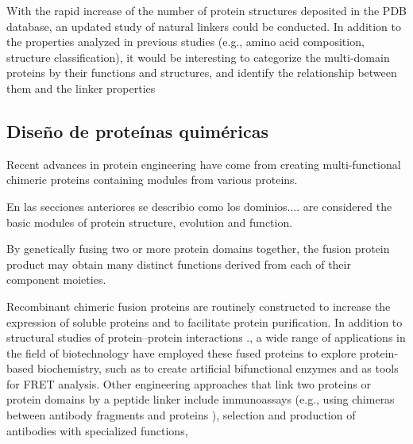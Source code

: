 




With the rapid increase of the number of protein structures deposited in the PDB database, an updated study of natural linkers could be conducted. 
In addition to the properties analyzed in previous studies (e.g., amino acid composition, structure classification), 
it would be interesting to categorize the multi-domain proteins by their functions and structures, and identify the relationship between them and the linker properties










\subsection{Diseño de proteínas quiméricas}



Recent advances in protein engineering have come from creating multi-functional chimeric proteins containing modules from various proteins.

En las secciones anteriores se describio como los dominios.... are considered the basic modules of protein structure, evolution and function.

By genetically fusing two or more protein domains together, the fusion protein product may obtain many distinct functions derived from each of their component moieties.


Recombinant chimeric fusion proteins are routinely constructed to increase the expression of soluble proteins and to facilitate protein purification.
In addition to structural studies of protein–protein interactions \cite{reddy2013linkers}., a wide range of applications in the field of biotechnology have employed these fused proteins
to explore protein-based biochemistry, such as to create artificial bifunctional enzymes and as tools for FRET analysis.
Other engineering approaches that link two proteins or protein domains by a peptide linker include immunoassays (e.g., using chimeras between antibody fragments and proteins ),  selection and production of antibodies with specialized functions, 




